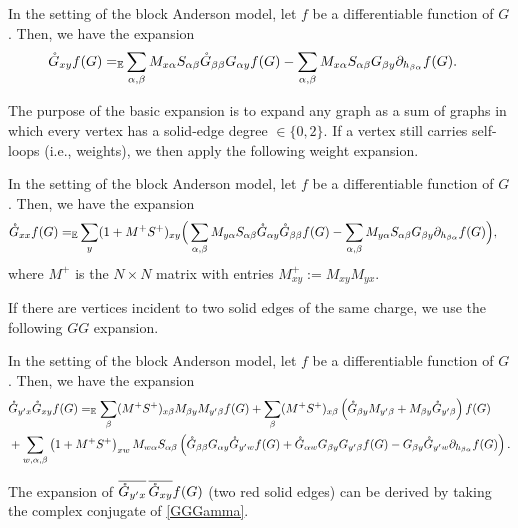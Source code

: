 \begin{lemma}\label{lanlw}
In the setting of the block Anderson model, let $f$ be a differentiable function of $G$. Then, we have the expansion
\begin{align} \label{eq:BE}
 {\mathring G}_{xy} f(G) =_{\mathbb{E}}  &
   \sum_{\alpha,\beta}  M_{x\alpha} S_{\alpha \beta}
 {\mathring G}_{\beta\beta} G _{\alpha y} f(G)
  - \sum_{\alpha,\beta}M_{x\alpha} S_{\alpha \beta} G _{\beta y} 
  \partial_{h_{ \beta\alpha}} f(G) .
 \end{align}
\end{lemma}

The purpose of the basic expansion is to expand any graph as a sum of graphs in which every vertex has a solid-edge degree $\in \{0,2\}$. If a vertex still carries self-loops (i.e., weights), we then apply the following weight expansion.

\begin{lemma} \label{lem_lweight}
In the setting of the block Anderson model, let $f$ be a differentiable function of $G$. Then, we have the expansion
\begin{align} \label{eq:LW}
{\mathring G} _{xx} f(G)  
=_{\mathbb{E}} &\sum_{y}(1+M^+S^+)_{xy}
 \Big(   \sum_{\alpha,\beta}  M_{y\alpha} S_{\alpha \beta} {\mathring G}_{ \alpha y} 
 {\mathring G}_{\beta\beta} f(G)
  - \sum_{\alpha,\beta}M_{y\alpha} S_{\alpha \beta} G _{\beta y} 
   \partial_{h_{ \beta\alpha}} f(G)\Big) ,
 \end{align}
where $M^+$ is the $N\times N$ matrix with entries $M^+_{xy}:=M_{xy}M_{yx}$. 
\end{lemma}



If there are vertices incident to two solid edges of the same charge, we use the following $GG$ expansion.
 
\begin{lemma}
In the setting of the block Anderson model, let $f$ be a differentiable function of $G$. Then, we have the expansion
\begin{align} 
&{\mathring G} _{y'x}{\mathring G} _{xy} f(G) 
=_{\mathbb{E}} \sum_\beta (M^+S^+) _{x\beta } M _{\beta y}M_{y'\beta}f(G)
+ \sum_{ \beta}(M^+S^+)_{x\beta}\left({\mathring G} _{\beta y}M_{y'\beta}+M_{\beta y}{\mathring G} _{y'\beta}\right)f(G)\label{GGGamma}
 \\ & +\sum_{w,\alpha,\beta}\left(1+M^+S^+\right)_{xw}M_{w\alpha} S_{\alpha \beta}\left(   
 {\mathring G}_{\beta\beta} G _{\alpha y} {\mathring G} _{y'w}f(G)
 + {\mathring G} _{\alpha w}G _{\beta y}G_{y'\beta}
   f(G) -  G _{\beta y} {\mathring G} _{y'w}
     \partial_{h_{ \beta\alpha}}   f(G)\right) .\nonumber
 \end{align}
\end{lemma}
The expansion of $\overline{{\mathring G}_{y'x}}\,\overline{{\mathring G}_{xy}} f(G)$ (two red solid edges) can be derived by taking the complex conjugate of \eqref{GGGamma}.

